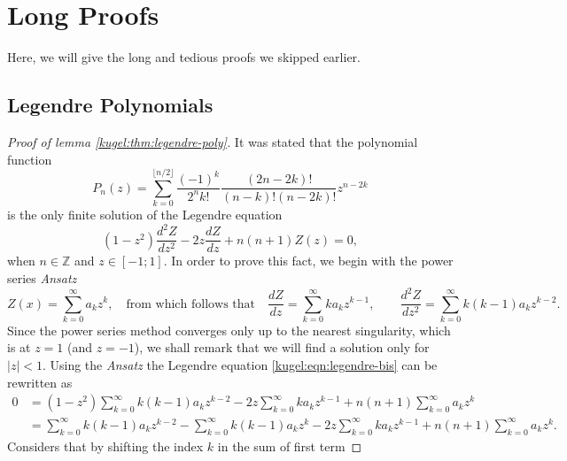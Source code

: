 \section{Long Proofs}

Here, we will give the long and tedious proofs we skipped earlier.

\subsection{Legendre Polynomials} \label{kugel:sec:proofs:legendre}

\begin{proof}[Proof of lemma \ref{kugel:thm:legendre-poly}]
  It was stated that the polynomial function
  \begin{equation*}
    P_n(z) = \sum^{\lfloor n/2 \rfloor}_{k=0}
      \frac{(-1)^k}{2^n k!} \frac{(2n - 2k)!}{(n - k)! (n-2k)!} z^{n - 2k}
  \end{equation*}
  is the only finite solution of the Legendre equation
  \begin{equation}
    \label{kugel:eqn:legendre-bis}
    (1 - z^2)\frac{d^2 Z}{dz^2}
    - 2z\frac{d Z}{dz}
    + n(n + 1) Z(z) = 0,
  \end{equation}
  when $n \in \mathbb{Z}$ and $z \in [-1; 1]$. In order to prove this fact, we
  begin with the power series \emph{Ansatz}
  \begin{equation*}
    Z(x) = \sum_{k=0}^\infty a_k z^k,
    \quad\text{from which follows that}\quad
    \frac{dZ}{dz} = \sum_{k=0}^\infty k a_k z^{k-1}, \qquad
    \frac{d^2 Z}{dz^2} = \sum_{k=0}^\infty k (k-1) a_k z^{k-2}.
  \end{equation*}
  Since the power series method converges only up to the nearest singularity,
  which is at $z=1$ (and $z=-1$), we shall remark that we will find a solution
  only for $|z|<1$. Using the \emph{Ansatz} the Legendre equation
  \eqref{kugel:eqn:legendre-bis} can be rewritten as
  \begin{align}
    0 &= (1-z^2) \sum_{k=0}^\infty k (k-1) a_k z^{k-2}
      - 2z\sum_{k=0}^\infty k a_k z^{k-1}
      + n(n+1)\sum_{k=0}^\infty a_k z^k \nonumber \\
    &= \sum_{k=0}^\infty k (k-1) a_k z^{k-2}
      - \sum_{k=0}^\infty k (k-1) a_k z^{k}
      - 2z\sum_{k=0}^\infty k a_k z^{k-1}
      + n(n+1)\sum_{k=0}^\infty a_k z^k. \label{kugel:eqn:legendre-ansatz}
  \end{align}
  Considers that by shifting the index $k$ in the sum of first term

\end{proof}
